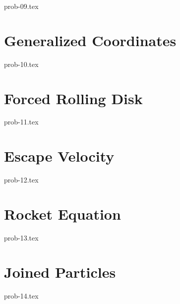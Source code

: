 {prob-09.tex}

\section{Generalized Coordinates}

{prob-10.tex}

\section{Forced Rolling Disk}

{prob-11.tex}

\section{Escape Velocity}

{prob-12.tex}

\section{Rocket Equation}

{prob-13.tex}

\section{Joined Particles}

{prob-14.tex}
